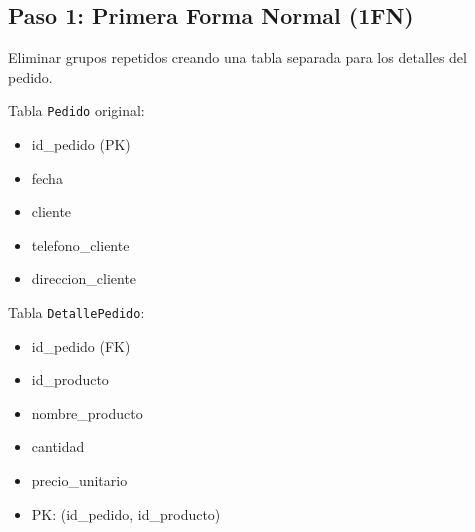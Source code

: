 \documentclass[12pt,a4paper,openany,oneside]{book}
\begin{document}
\subsection{Paso 1: Primera Forma Normal (1FN)}
Eliminar grupos repetidos creando una tabla separada para los detalles del pedido.

Tabla \texttt{Pedido} original:
\begin{itemize}
    \item id\_pedido (PK)
    \item fecha
    \item cliente
    \item telefono\_cliente
    \item direccion\_cliente
\end{itemize}

Tabla \texttt{DetallePedido}:
\begin{itemize}
    \item id\_pedido (FK)
    \item id\_producto
    \item nombre\_producto
    \item cantidad
    \item precio\_unitario
    \item PK: (id\_pedido, id\_producto)
\end{itemize}
\end{document}
